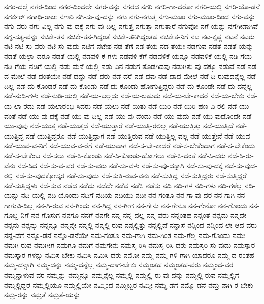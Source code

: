 {ನಗರ-ದಲ್ಲೆ
ನಗರ-ದಿಂದ
ನಗರ-ದಿಂದಲೇ
ನಗರ-ವನ್ನು
ನಗರದ
ನಗರಿ
ನಗರಿ-ಗಾ-ದರೋ
ನಗರಿ-ಯಲ್ಲಿ
ನಗರಿ-ಯೊ-ಡನೆ
ನಗರ್ಕರ್
ನಗಾಧಿ-ರಾಜಃ
ನಗಾರಿ
ನಗಿ-ಸು-ವು-ದನ್ನು
ನಗು
ನಗು-ನಗುತ್ತ
ನಗು-ಮುಖ
ನಗು-ಮುಖ-ದಿಂದ
ನಗು-ವನ್ನು
ನಗು-ವರು
ನಗು-ವಿಲ್ಲ
ನಗು-ವು-ದಕ್ಕೆ
ನಗು-ವು-ದಿಲ್ಲ
ನಗುತ್ತ
ನಗುತ್ತಾ
ನಗುತ್ತಾರೆ
ನಗುವೋ
ನಗೆ-ಯನ್ನು
ನಗೆಗೀಡಾಗಿವೆ
ನಗ್ನ-ಸತ್ಯ-ವನ್ನು
ನಚಿಕೇ-ತನ
ನಚಿಕೇ-ತನ-ಗಿದ್ದಂತೆ
ನಚಿಕೇ-ತನಿಗಿದ್ದಂತಹ
ನಚಿಕೇತ-ನಿಗೆ
ನಟ
ನಟ-ಕೃಷ್ಣ
ನಟನೆ
ನಟರು
ನಟಿ
ನಟಿ-ಸು-ವರು
ನಟಿ-ಸು-ವುದು
ನಟಿಗೆ
ನಟೇಶ
ನಡ-ತೆಗೆ
ನಡ-ತೆಯ
ನಡ-ತೆಯೇ
ನಡಗುವ
ನಡತೆ
ನಡತೆ-ಯನ್ನು
ನಡತೆ-ಯಲ್ಲಾ-ದರೂ
ನಡತೆ-ಯಲ್ಲಿ
ನಡವಳಿ-ಕೆ-ಗಳು
ನಡವಳಿ-ಕೆಗೆ
ನಡವಳಿಕೆ-ಯನ್ನೂ
ನಡವಳಿಕೆ-ಯಲ್ಲಿ
ನಡಿ-ಗೆಯ
ನಡಿ-ಗೆಯೆ
ನಡಿಗೆ-ಯಲ್ಲಿ
ನಡು-ಮನೆ-ಯಲ್ಲಿ
ನಡು-ವಿನ
ನಡುಗ-ತೊಡಗಿದವು
ನಡುಗಿಸು-ವು-ದಕ್ಕೂ
ನಡುವೆ
ನಡೆ
ನಡೆ-ದ-ಮೇಲೆ
ನಡೆ-ದಂತೆಯೇ
ನಡೆ-ದದ್ದು
ನಡೆ-ದರು
ನಡೆ-ದರೆ
ನಡೆ-ದವು
ನಡೆ-ದಾದ-ಮೇಲೆ
ನಡೆ-ದಿ-ರುವುದನ್ನೆಲ್ಲ
ನಡೆ-ದಿಲ್ಲ
ನಡೆ-ದು-ಕೊಂಡರೆ
ನಡೆ-ದು-ಕೊಂಡು
ನಡೆ-ದು-ಕೊಂಡು-ಹೋಗುತ್ತಿದ್ದರು
ನಡೆ-ದು-ಕೊಂಡೇ
ನಡೆ-ದು-ದನ್ನೆಲ್ಲ
ನಡೆ-ನುಡಿ-ಗಳು
ನಡೆ-ನುಡಿ-ಯಲ್ಲಿ
ನಡೆ-ಯ-ಬಲ್ಲದು
ನಡೆ-ಯ-ಬಹುದು
ನಡೆ-ಯ-ಬೇ-ಕಾದರೆ
ನಡೆ-ಯ-ಬೇಕು
ನಡೆ-ಯ-ಲಾ-ರದು
ನಡೆ-ಯಲಾರಂಭಿ-ಸಿದರು
ನಡೆ-ಯಲು
ನಡೆ-ಯಿತು
ನಡೆ-ಯಿರಿ
ನಡೆ-ಯಿರಿ-ಹಣ-ವಿ-ರಲಿ
ನಡೆ-ಯು-ವಂತೆ
ನಡೆ-ಯು-ವು-ದಕ್ಕೆ
ನಡೆ-ಯು-ವು-ದಿಲ್ಲ
ನಡೆ-ಯು-ವು-ದೆಂದು
ನಡೆ-ಯು-ವುದು
ನಡೆ-ಯು-ವುದೊಂದೇ
ನಡೆ-ಯು-ವುವು
ನಡೆ-ಯುತ್ತ
ನಡೆ-ಯುತ್ತದೆ
ನಡೆ-ಯುತ್ತಾರೆ
ನಡೆ-ಯುತ್ತಿ-ರಲಿಲ್ಲ
ನಡೆ-ಯುತ್ತಿತ್ತು
ನಡೆ-ಯುತ್ತಿದೆ
ನಡೆ-ಯುತ್ತಿದ್ದ
ನಡೆ-ಯುತ್ತಿದ್ದರೂ
ನಡೆ-ಯುತ್ತಿದ್ದಾಗ
ನಡೆ-ಯುತ್ತಿರುವ
ನಡೆ-ಯುತ್ತಿಲ್ಲ-ವಲ್ಲ
ನಡೆ-ಯುತ್ತೇನೆ
ನಡೆ-ಯುವ
ನಡೆ-ಯುವ-ವ-ನಿಗೆ
ನಡೆ-ಯುವ-ವ-ರೆಗೆ
ನಡೆ-ಯುವಾಗ
ನಡೆ-ಸ-ಬೇ-ಕಾದರೆ
ನಡೆ-ಸ-ಬೇಕೆಂದಾಗ
ನಡೆ-ಸ-ಬೇಕೆಂದು
ನಡೆ-ಸ-ಬೇಕೆಂಬ
ನಡೆ-ಸಲು
ನಡೆ-ಸಿ-ಕೊಂಡು
ನಡೆ-ಸಿ-ಕೊಂಡು-ಹೋಗಲು
ನಡೆ-ಸಿ-ದಂತೆ
ನಡೆ-ಸಿ-ದರು
ನಡೆ-ಸಿ-ರು-ವೆನು
ನಡೆ-ಸಿದ
ನಡೆ-ಸು-ವ-ವರ
ನಡೆ-ಸು-ವರು
ನಡೆ-ಸು-ವಳು
ನಡೆ-ಸು-ವು-ದಕ್ಕಾಗಿ
ನಡೆ-ಸು-ವು-ದಕ್ಕೆ
ನಡೆ-ಸು-ವುದ-ರಲ್ಲಿ
ನಡೆ-ಸು-ವುದಕ್ಕೋಸ್ಕರ
ನಡೆ-ಸು-ವುದು
ನಡೆ-ಸುತ್ತಿ-ರುವ-ವನು
ನಡೆ-ಸುತ್ತಿದ್ದ
ನಡೆ-ಸುತ್ತಿದ್ದರು
ನಡೆ-ಸುತ್ತಿದ್ದರೆ
ನಡೆ-ಸುತ್ತಿದ್ದಳು
ನಡೆ-ಸುವ
ನಡೆದ
ನಡೆದು
ನಡೆದೇ
ನಡೆವ
ನಡೆಸಿ
ನಡೆಸು
ನದಿ
ನದಿ-ಗಳ
ನದಿ-ಗಳು
ನದಿ-ಗಳೆಲ್ಲ
ನದಿ-ಯನ್ನು
ನದಿ-ಯಲ್ಲಿ
ನದಿ-ಯೊಂದು
ನದಿಗೆ
ನದಿಯ
ನದಿಯು
ನದೀ
ನನ-ಗಂತೂ
ನನ-ಗಾ-ವು-ದರ
ನನ-ಗಾಗಿ
ನನ-ಗಾಗುವಿ-ದಿಲ್ಲ
ನನ-ಗಿ-ರುವ
ನನ-ಗಿಂದು
ನನ-ಗಿದ್ದ
ನನ-ಗೀಗ
ನನ-ಗೇನು
ನನ-ಗೇನೂ
ನನ-ಗೇನೋ
ನನ-ಗೊಂದು
ನನ-ಗೊಬ್ಬ-ನಿಗೆ
ನನ-ಗೊಸುಗ
ನನಗೂ
ನನಗೆ
ನನಗೇ
ನನ್ನ
ನನ್ನ-ದಲ್ಲ
ನನ್ನ-ವರು
ನನ್ನಂತಹ
ನನ್ನಂತೆ
ನನ್ನದು
ನನ್ನದೇ
ನನ್ನನು
ನನ್ನನ್ನು
ನನ್ನನ್ನೂ
ನನ್ನನ್ನೇ
ನನ್ನಲ್ಲಿ
ನನ್ನಲ್ಲಿ-ರುವ
ನನ್ನಲ್ಲಿತ್ತು
ನನ್ನಲ್ಲಿದೆ
ನನ್ನಾಸೆ
ನನ್ನಿಂದ
ನನ್ನಿಂದ-ಲೇ-ಆದ-ವರು
ನನ್ನೆ-ಡೆಗೆ
ನನ್ನೊ-ಡನೆ
ನನ್ನೊ-ಡನೆಯೇ
ನಮ-ಗಂತೂ
ನಮ-ಗಾಗಿ
ನಮ-ಗಿಂತ
ನಮ-ಗೆಲ್ಲ
ನಮ-ಗೊಂದು
ನಮಃ
ನಮಗಿ-ರುವ
ನಮಗೀಗ
ನಮಗೂ
ನಮಗೆ
ನಮಗೇನು
ನಮಸ್ಕ-ರಿಸಿ
ನಮಸ್ಕ-ರಿಸಿ-ದರು
ನಮಸ್ಕರಿ-ಸು-ವುದು
ನಮಸ್ಕಾರ
ನಮಸ್ಕಾರ-ಗಳನ್ನು
ನಮಿಸ-ಬೇಕು
ನಮಿಸಿ
ನಮಿಸಿ-ದರು
ನಮೋ
ನಮ್ಮ
ನಮ್ಮ-ಗಳಿ-ಗಾಗಿ-ಯಾದರೂ
ನಮ್ಮ-ದ-ರಂತಹ
ನಮ್ಮ-ದನ್ನಾಗಿ
ನಮ್ಮ-ದನ್ನು
ನಮ್ಮ-ದನ್ನೆಲ್ಲ
ನಮ್ಮ-ದಾಗ-ಬೇಕು
ನಮ್ಮಂತಹ
ನಮ್ಮಂತಹ-ವರು
ನಮ್ಮಂಥ-ವರ
ನಮ್ಮನ್ನಾಳುವ-ವರ
ನಮ್ಮನ್ನು
ನಮ್ಮನ್ನೂ
ನಮ್ಮನ್ನೆಲ್ಲ
ನಮ್ಮಲ್ಲಿ
ನಮ್ಮಲ್ಲಿ-ರು-ವು-ದನ್ನು
ನಮ್ಮಲ್ಲಿ-ರುವ
ನಮ್ಮಲ್ಲಿಗೆ
ನಮ್ಮಲ್ಲಿದ್ದರೆ
ನಮ್ಮಲ್ಲಿಯೂ
ನಮ್ಮಲ್ಲಿಯೇ
ನಮ್ಮಿಂದ
ನಮ್ಮಿಬ್ಬರ
ನಮ್ಮೀ
ನಮ್ಮೆ-ಡೆಗೆ
ನಮ್ಮೊ-ಡನೆ
ನಮ್ರ-ನಾಗಿ-ರ-ಬೇಕು
ನಮ್ರ-ರನ್ನು
ನಮ್ರತೆ
ನಮ್ರತೆ-ಯನ್ನು
}
